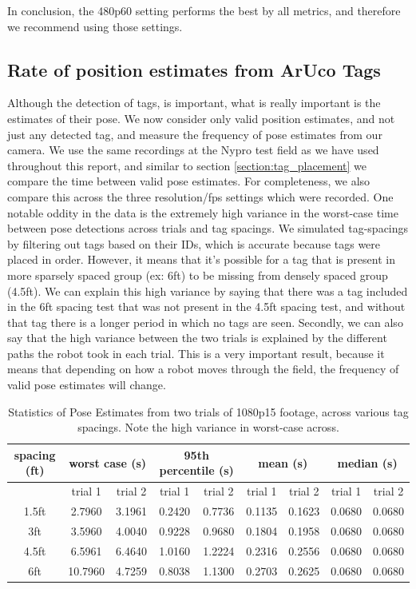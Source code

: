 \documentclass{article}
\begin{document}
    In conclusion, the 480p60 setting performs the best by all metrics, and therefore we recommend using those settings.

  \subsection{Rate of position estimates from ArUco Tags}

    Although the detection of tags, is important, what is really important is the estimates of their pose. We now consider only valid position estimates, and not just any detected tag, and measure the frequency of pose estimates from our camera. We use the same recordings at the Nypro test field as we have used throughout this report, and similar to section \ref{section:tag_placement} we compare the time between valid pose estimates. For completeness, we also compare this across the three resolution/fps settings which were recorded. One notable oddity in the data is the extremely high variance in the worst-case time between pose detections across trials and tag spacings. We simulated tag-spacings by filtering out tags based on their IDs, which is accurate because tags were placed in order. However, it means that it's possible for a tag that is present in more sparsely spaced group (ex: 6ft) to be missing from densely spaced group (4.5ft). We can explain this high variance by saying that there was a tag included in the 6ft spacing test that was not present in the 4.5ft spacing test, and without that tag there is a longer period in which no tags are seen. Secondly, we can also say that the high variance between the two trials is explained by the different paths the robot took in each trial. This is a very important result, because it means that depending on how a robot moves through the field, the frequency of valid pose estimates will change.

    \begin{table}[H]
      \centering
      \begin{tabular}{|c|c|c|c|c|c|c|c|c|} \hline
        spacing (ft) & \multicolumn{2}{c}{worst case (s)} & \multicolumn{2}{c}{95th percentile (s)} & \multicolumn{2}{c}{mean (s)} & \multicolumn{2}{c|}{median (s)} \\ \hline
            & trial 1 & trial 2 & trial 1 & trial 2 & trial 1 & trial 2 & trial 1 & trial 2 \\ \hline
            1.5ft & 2.7960 & 3.1961 & 0.2420 & 0.7736 & 0.1135 & 0.1623 & 0.0680 & 0.0680 \\ \hline
            3ft   & 3.5960 & 4.0040 & 0.9228 & 0.9680 & 0.1804 & 0.1958 & 0.0680 & 0.0680 \\ \hline
            4.5ft & 6.5961 & 6.4640 & 1.0160 & 1.2224 & 0.2316 & 0.2556 & 0.0680 & 0.0680 \\ \hline
            6ft   & 10.7960 & 4.7259 & 0.8038 & 1.1300 & 0.2703 & 0.2625 & 0.0680 & 0.0680 \\ \hline
      \end{tabular}
      \caption{Statistics of Pose Estimates from two trials of 1080p15 footage, across various tag spacings. Note the high variance in worst-case across.}
      \label{table:1080p15_pose_estimate_stats}
    \end{table}
\end{document}
